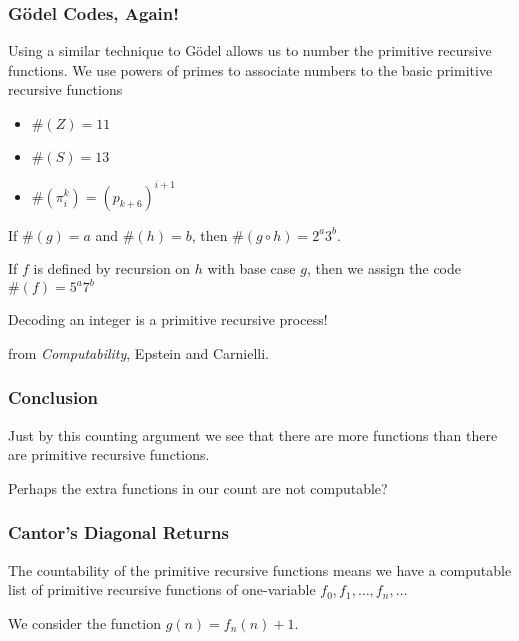 \documentclass{beamer}
\begin{document}
\begin{frame}
	\frametitle{G\"{o}del Codes, Again!}

	Using a similar technique to G\"{o}del allows us to number the primitive recursive functions. We use powers of primes to associate numbers to the basic primitive recursive functions 

	\begin{itemize}
		\item $\#(Z) = 11$ 
		\item $\#(S) = 13$
		\item $\#(\pi_{i}^{k}) = (p_{k+6})^{i+1}$
	\end{itemize}

	\vspace{0.5cm}

	If $\#(g) = a$ and $\#(h) = b$, then $\#(g\circ h) = 2^{a}3^{b}$.

	\vspace{0.5cm}

	If $f$ is defined by recursion on $h$ with base case $g$, then we assign the code $\#(f) = 5^{a}7^{b}$

	\vspace{0.5cm}

	Decoding an integer is a primitive recursive process!

	\vspace{1cm}

	from \emph{Computability}, Epstein and Carnielli.

\end{frame}

\begin{frame}
	\frametitle{Conclusion}

	Just by this counting argument we see that there are more functions than there are primitive recursive functions. 

	\vspace{0.5cm}

	Perhaps the extra functions in our count are not computable? 

	\vspace{5cm}

\end{frame}

\begin{frame}
	\frametitle{Cantor's Diagonal Returns}

	The countability of the primitive recursive functions means we have a computable list of primitive recursive functions of one-variable $f_{0}, f_{1}, \dots , f_{n}, \dots $

	\vspace{0.5cm}

	We consider the function $g(n) = f_{n}(n) + 1$. 

	\vspace{5cm}


\end{frame}
\end{document}
